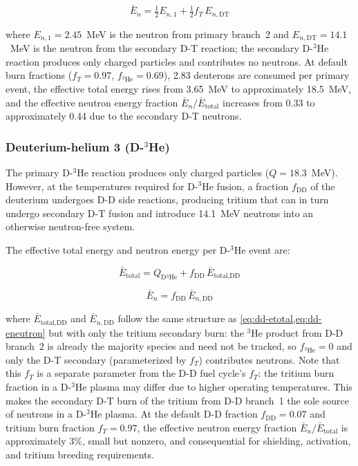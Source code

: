 \documentclass{article}
\begin{document}
\begin{equation}
\label{eq:dd-eneutron}
\bar{E}_n = \tfrac{1}{2} E_{n,1} + \tfrac{1}{2} f_T \, E_{n,\text{DT}}
\end{equation}

\noindent where $E_{n,1} = 2.45$~MeV is the neutron from primary branch~2
and $E_{n,\text{DT}} = 14.1$~MeV is the neutron from the secondary D-T
reaction; the secondary D-${}^3$He reaction produces only charged
particles and contributes no neutrons.
At default burn fractions ($f_T = 0.97$,
$f_{{}^3\text{He}} = 0.69$), 2.83 deuterons are consumed per primary
event, the effective total energy rises from
3.65~MeV to approximately 18.5~MeV, and the effective
neutron energy fraction $\bar{E}_n / \bar{E}_{\text{total}}$ increases from
0.33 to approximately 0.44 due to the secondary D-T neutrons.

\subsubsection{\texorpdfstring{Deuterium-helium 3 (D-${}^3$He)}{Deuterium-helium 3 (D-3He)}}
The primary D-${}^3$He reaction produces only charged particles
($Q = 18.3$~MeV). However, at the temperatures required
for D-${}^3$He fusion, a fraction $f_{\text{DD}}$ of the deuterium
undergoes D-D side reactions, producing tritium that can in turn
undergo secondary D-T fusion and introduce 14.1~MeV neutrons into
an otherwise neutron-free system.

The effective total energy and neutron energy per D-${}^3$He event are:

\begin{equation}
\label{eq:dhe3-etotal}
\bar{E}_{\text{total}} = Q_{\text{D}{}^3\text{He}}
  + f_{\text{DD}} \, \bar{E}_{\text{total,DD}}
\end{equation}

\begin{equation}
\label{eq:dhe3-eneutron}
\bar{E}_n = f_{\text{DD}} \, \bar{E}_{n,\text{DD}}
\end{equation}

\noindent where $\bar{E}_{\text{total,DD}}$ and
$\bar{E}_{n,\text{DD}}$ follow the same structure as
\cref{eq:dd-etotal,eq:dd-eneutron} but with only the tritium
secondary burn: the ${}^3$He product from D-D branch~2 is already the
majority species and need not be tracked, so $f_{{}^3\text{He}} = 0$
and only the D-T secondary (parameterized by $f_T$) contributes
neutrons. Note that this $f_T$ is a separate parameter from the
D-D fuel cycle's $f_T$: the tritium burn fraction in a D-${}^3$He
plasma may differ due to higher operating temperatures.
This makes the secondary D-T burn of the tritium from D-D
branch~1 the sole source of neutrons in a D-${}^3$He plasma.
At the default D-D fraction $f_{\text{DD}} = 0.07$ and tritium burn
fraction $f_T = 0.97$, the effective neutron energy fraction
$\bar{E}_n / \bar{E}_{\text{total}}$ is approximately 3\%, small but
nonzero, and consequential for shielding, activation, and tritium
breeding requirements.
\end{document}
